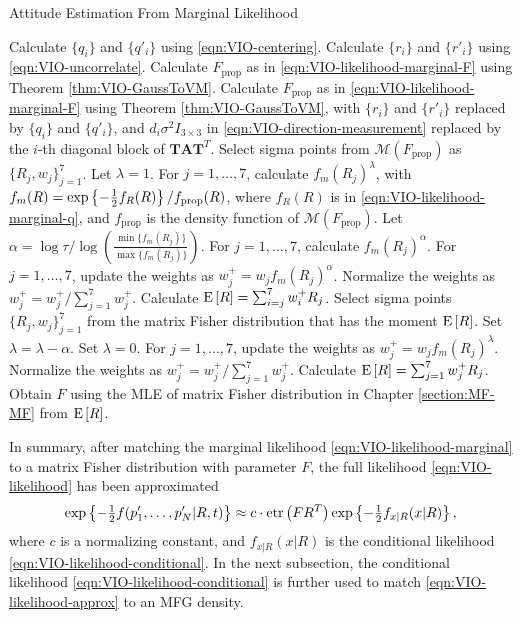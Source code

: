 \begin{table}
	\caption{Attitude Estimation From Marginal Likelihood}
	\label{tab:VIO-marginal}
	\begin{algorithmic}[1]
		\algrule[0.8pt]
		\algrule
		\State Calculate $\{q_i\}$ and $\{q'_i\}$ using \eqref{eqn:VIO-centering}.
		\State Calculate $\{r_i\}$ and $\{r'_i\}$ using \eqref{eqn:VIO-uncorrelate}.
		\State Calculate $F_\text{prop}$ as in \eqref{eqn:VIO-likelihood-marginal-F} using Theorem \ref{thm:VIO-GaussToVM}.
		\Else
		\State Calculate $F_\text{prop}$ as in \eqref{eqn:VIO-likelihood-marginal-F} using Theorem \ref{thm:VIO-GaussToVM}, with $\{r_i\}$ and $\{r'_i\}$ replaced by $\{q_i\}$ and $\{q'_i\}$, and $d_i\sigma^2I_{3\times 3}$ in \eqref{eqn:VIO-direction-measurement} replaced by the $i$-th diagonal block of $\mathbf{TAT}^T$.
		\EndIf
		\State Select sigma points \cite{gilitschenski2015unscented,lee2018bayesian} from $\mathcal{M}(F_\text{prop})$ as $\{R_j,w_j\}_{j=1}^7$.
		\State Let $\lambda = 1$.
		\State For $j=1,\ldots,7$, calculate $f_m(R_j)^\lambda$, with $f_m(R) = \exp\left\{ -\tfrac{1}{2}f_R(R) \right\} / f_\text{prop}(R)$, where $f_R(R)$ is in \eqref{eqn:VIO-likelihood-marginal-q}, and $f_\text{prop}$ is the density function of $\mathcal{M}(F_\text{prop})$.
		\State Let $\alpha = \log\tau / \log\left( \tfrac{\min\{f_m(R_j)\}}{\max\{f_m(R_j)\}} \right)$.
		\State For $j=1,\ldots,7$, calculate $f_m(R_j)^\alpha$.
		\State For $j=1,\ldots,7$, update the weights as $w_j^+ = w_j f_m(R_j)^\alpha$.
		\State Normalize the weights as $w_j^+ = w_j^+/\sum_{j=1}^7 w_j^+$.
		\State Calculate $\mathrm{E}\left[ R \right] = \sum_{i=j}^7 w_i^+ R_j$.
		\State Select sigma points $\{R_j,w_j\}_{j=1}^7$ from the matrix Fisher distribution that has the moment $\mathrm{E}\left[ R \right]$.
		\State Set $\lambda = \lambda-\alpha$.
		\Else
		\State Set $\lambda = 0$.
		\EndIf
		\EndWhile
		\State For $j=1,\ldots,7$, update the weights as $w_j^+ = w_j f_m(R_j)^\lambda$.
		\State Normalize the weights as $w_j^+ = w_j^+/\sum_{j=1}^7 w_j^+$.
		\State Calculate $\mathrm{E}\left[ R \right] = \sum_{j=1}^7 w_j^+ R_j$.
		\State Obtain $F$ using the MLE of matrix Fisher distribution in Chapter \ref{section:MF-MF} from $\mathrm{E}\left[ R \right]$.
		\EndProcedure
		\algrule[0.8pt]
	\end{algorithmic}
\end{table}

In summary, after matching the marginal likelihood \eqref{eqn:VIO-likelihood-marginal} to a matrix Fisher distribution with parameter $F$, the full likelihood \eqref{eqn:VIO-likelihood} has been approximated 
\begin{align} \label{eqn:VIO-likelihood-approx}
	\exp\left\{ -\tfrac{1}{2}f(p'_1,\ldots,p'_N|R,t) \right\} \approx c\cdot \mathrm{etr}\left( FR^T \right) \exp\left\{ -\tfrac{1}{2}f_{x|R}(x|R) \right\},
\end{align}
where $c$ is a normalizing constant, and $f_{x|R}(x|R)$ is the conditional likelihood \eqref{eqn:VIO-likelihood-conditional}.
In the next subsection, the conditional likelihood \eqref{eqn:VIO-likelihood-conditional} is further used to match \eqref{eqn:VIO-likelihood-approx} to an MFG density.

